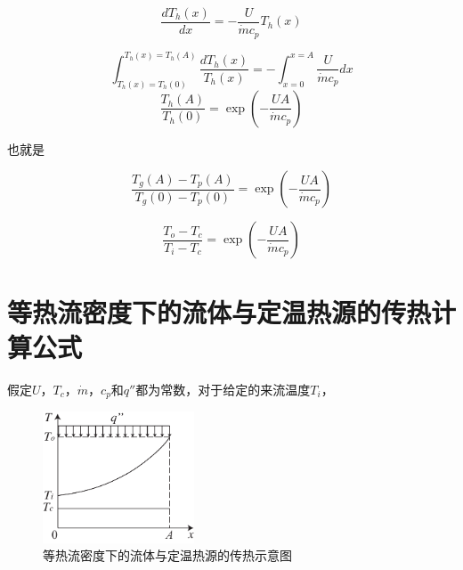 \begin{equation}
\frac{dT_{h}(x)}{dx}=-\frac{U}{\dot{m}c_{p}}T_{h}(x)\label{eq:T_h(x)}
\end{equation}

\begin{equation}
\int_{T_{h}(x)=T_{h}(0)}^{T_{h}(x)=T_{h}(A)}\frac{dT_{h}(x)}{T_{h}(x)}=-\int_{x=0}^{x=A}\frac{U}{\dot{m}c_{p}}dx
\end{equation}
\begin{equation}
\frac{T_{h}(A)}{T_{h}(0)}=\exp(-\frac{UA}{\dot{m}c_{p}})
\end{equation}

也就是

\begin{equation}
\frac{T_{g}(A)-T_{p}(A)}{T_{g}(0)-T_{p}(0)}=\exp(-\frac{UA}{\dot{m}c_{p}})
\end{equation}

\begin{equation}
\frac{T_{o}-T_{c}}{T_{i}-T_{c}}=\exp(-\frac{UA}{\dot{m}c_{p}})
\label{eq:Eq}
\end{equation}

\chapter{等热流密度下的流体与定温热源的传热计算公式}
\label{cha:CTCHFHX}

假定$U$，$T_{c}$，$\dot{m}$，$c_p$和$q''$都为常数，对于给定的来流温度${T_i}$，

\noindent \begin{center}
\begin{figure}[h]
\noindent \begin{centering}
\includegraphics[width=0.4\textwidth]{fig/CTCHFHX.pdf}\caption{等热流密度下的流体与定温热源的传热示意图}
\label{fig:CTCHFHX}
\par\end{centering}
\end{figure}
\par\end{center}

